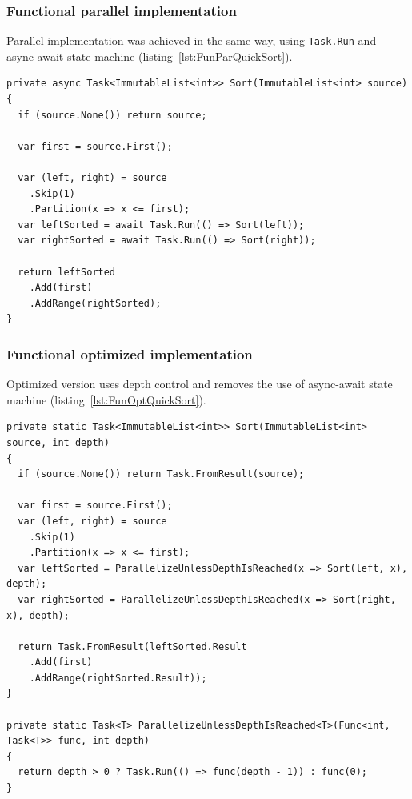\subsubsection{Functional parallel implementation}
Parallel implementation was achieved in the same way, using \texttt{Task.Run} and async-await state machine 
(listing~\ref{lst:FunParQuickSort}).
\begin{lstlisting}[language={[sharp]c}, style=sharpcstyle, caption={Functional parallel quicksort}, label={lst:FunParQuickSort},
numbers=none, xleftmargin=0pt,framexleftmargin=0pt,framexrightmargin=0pt,framexbottommargin=0pt]
private async Task<ImmutableList<int>> Sort(ImmutableList<int> source)
{
  if (source.None()) return source;

  var first = source.First();
  
  var (left, right) = source
    .Skip(1)
    .Partition(x => x <= first);
  var leftSorted = await Task.Run(() => Sort(left));
  var rightSorted = await Task.Run(() => Sort(right));

  return leftSorted
    .Add(first)
    .AddRange(rightSorted);
}
\end{lstlisting}

\subsubsection{Functional optimized implementation}
Optimized version uses depth control and removes the use of async-await state machine (listing~\ref{lst:FunOptQuickSort}).
\begin{lstlisting}[language={[sharp]c}, style=sharpcstyle, caption={Functional optimized quicksort}, label={lst:FunOptQuickSort},
numbers=none, xleftmargin=0pt,framexleftmargin=0pt,framexrightmargin=0pt,framexbottommargin=0pt]
private static Task<ImmutableList<int>> Sort(ImmutableList<int> source, int depth)
{
  if (source.None()) return Task.FromResult(source);

  var first = source.First();
  var (left, right) = source
    .Skip(1)
    .Partition(x => x <= first);
  var leftSorted = ParallelizeUnlessDepthIsReached(x => Sort(left, x), depth);
  var rightSorted = ParallelizeUnlessDepthIsReached(x => Sort(right, x), depth);

  return Task.FromResult(leftSorted.Result
    .Add(first)
    .AddRange(rightSorted.Result));
}

private static Task<T> ParallelizeUnlessDepthIsReached<T>(Func<int, Task<T>> func, int depth)
{
  return depth > 0 ? Task.Run(() => func(depth - 1)) : func(0);
}
\end{lstlisting}



